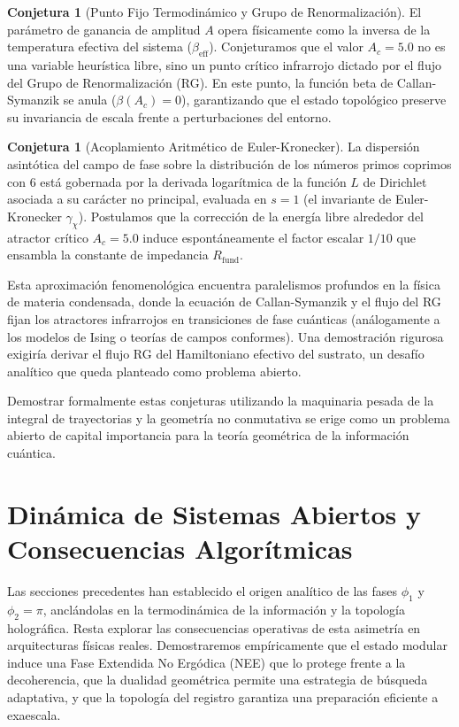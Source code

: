 \documentclass[12pt,a4paper]{article}
\theoremstyle{plain}
\theoremstyle{definition}
\newtheorem{conjetura}[teorema]{Conjetura}
\theoremstyle{remark}
\begin{document}
\begin{conjetura}[Punto Fijo Termodinámico y Grupo de Renormalización]
El parámetro de ganancia de amplitud $A$ opera físicamente como la inversa de la temperatura efectiva del sistema ($\beta_{\text{eff}}$). Conjeturamos que el valor $A_c = 5.0$ no es una variable heurística libre, sino un punto crítico infrarrojo dictado por el flujo del Grupo de Renormalización (RG). En este punto, la función beta de Callan-Symanzik se anula ($\beta(A_c)=0$), garantizando que el estado topológico preserve su invariancia de escala frente a perturbaciones del entorno.
\end{conjetura}

\begin{conjetura}[Acoplamiento Aritmético de Euler-Kronecker]
La dispersión asintótica del campo de fase sobre la distribución de los números primos coprimos con 6 está gobernada por la derivada logarítmica de la función $L$ de Dirichlet asociada a su carácter no principal, evaluada en $s=1$ (el invariante de Euler-Kronecker $\gamma_{\chi}$). Postulamos que la corrección de la energía libre alrededor del atractor crítico $A_c=5.0$ induce espontáneamente el factor escalar $1/10$ que ensambla la constante de impedancia $R_{\text{fund}}$.
\end{conjetura}

Esta aproximación fenomenológica encuentra paralelismos profundos en la física de materia condensada, donde la ecuación de Callan-Symanzik y el flujo del RG fijan los atractores infrarrojos en transiciones de fase cuánticas (análogamente a los modelos de Ising o teorías de campos conformes). Una demostración rigurosa exigiría derivar el flujo RG del Hamiltoniano efectivo del sustrato, un desafío analítico que queda planteado como problema abierto.

Demostrar formalmente estas conjeturas utilizando la maquinaria pesada de la integral de trayectorias y la geometría no conmutativa se erige como un problema abierto de capital importancia para la teoría geométrica de la información cuántica.

\section{Dinámica de Sistemas Abiertos y Consecuencias Algorítmicas}
\label{sec:consecuencias}

Las secciones precedentes han establecido el origen analítico de las fases $\phi_1$ y $\phi_2 = \pi$, anclándolas en la termodinámica de la información y la topología holográfica. Resta explorar las consecuencias operativas de esta asimetría en arquitecturas físicas reales. Demostraremos empíricamente que el estado modular induce una Fase Extendida No Ergódica (NEE) que lo protege frente a la decoherencia, que la dualidad geométrica permite una estrategia de búsqueda adaptativa, y que la topología del registro garantiza una preparación eficiente a exaescala.
\end{document}
